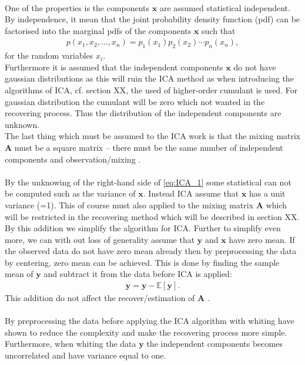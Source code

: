 \\
One of the properties is the components $\mathbf{x}$ are assumed statistical independent. By independence, it mean that the joint probability density function (pdf) can be factorised into the marginal pdfs of the components $\mathbf{x}$ such that
\begin{align*}
p(x_1, x_2, \dots, x_n) = p_1 (x_1) p_2(x_2) \cdots p_n(x_n),
\end{align*}
for the random variables $x_i$.
\\
Furthermore it is assumed that the independent components $\mathbf{x}$ do not have gaussian distributions as this will ruin the ICA method as when introducing the algorithms of ICA, cf. section XX, the used of higher-order cumulant is used. For gaussian distribution the cumulant will be zero which not wanted in the recovering process. Thus the distribution of the independent components are unknown.
\\
The last thing which must be assumed to the ICA work is that the mixing matrix $\mathbf{A}$ must be a square matrix -- there must be the same number of independent components and observation/mixing \cite[p. 152-153]{ICA}.
\\ \\
By the unknowing of the right-hand side of \eqref{eq:ICA_1} some statistical can not be computed such as the variance of $\mathbf{x}$. Instead ICA assume that $\mathbf{x}$ has a unit variance (=1). This of course must also applied to the mixing matrix $\mathbf{A}$ which will be restricted in the recovering method which will be described in section XX. By this addition we simplify the algorithm for ICA. Further to simplify even more, we can with out loss of generality assume that $\mathbf{y}$ and $\mathbf{x}$ have zero mean. If the observed data do not have zero mean already then by preprocessing the data by centering, zero mean can be achieved. This is done by finding the sample mean of $\mathbf{y}$ and subtract it from the data before ICA is applied:
\begin{align*}
\mathbf{y} = \mathbf{y} - \mathbb{E}[\mathbf{y}].
\end{align*}
This addition do not affect the recover/estimation of $\mathbf{A}$ \cite[p. 154]{ICA}.
\\ \\
By preprocessing the data before applying the ICA algorithm with whiting have shown to reduce the complexity and make the recovering process more simple. Furthermore, when whiting the data $\mathbf{y}$ the independent components becomes uncorrelated and have variance equal to one.
